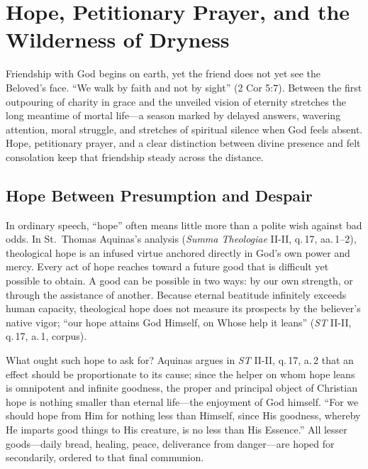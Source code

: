 \section{Hope, Petitionary Prayer, and the Wilderness of Dryness}

Friendship with God begins on earth, yet the friend does not yet see the Beloved's face. ``We walk by faith and not by sight'' (2 Cor 5:7). Between the first outpouring of charity in grace and the unveiled vision of eternity stretches the long meantime of mortal life---a season marked by delayed answers, wavering attention, moral struggle, and stretches of spiritual silence when God feels absent. Hope, petitionary prayer, and a clear distinction between divine presence and felt consolation keep that friendship steady across the distance.

\subsection*{Hope Between Presumption and Despair}

In ordinary speech, ``hope'' often means little more than a polite wish against bad odds. In St.\ Thomas Aquinas's analysis (\emph{Summa Theologiae} II-II, q.\,17, aa.\,1--2), theological hope is an infused virtue anchored directly in God's own power and mercy. Every act of hope reaches toward a future good that is difficult yet possible to obtain. A good can be possible in two ways: by our own strength, or through the assistance of another. Because eternal beatitude infinitely exceeds human capacity, theological hope does not measure its prospects by the believer's native vigor; ``our hope attains God Himself, on Whose help it leans'' (\emph{ST} II-II, q.\,17, a.\,1, corpus).

What ought such hope to ask for? Aquinas argues in \emph{ST} II-II, q.\,17, a.\,2 that an effect should be proportionate to its cause; since the helper on whom hope leans is omnipotent and infinite goodness, the proper and principal object of Christian hope is nothing smaller than eternal life---the enjoyment of God himself. ``For we should hope from Him for nothing less than Himself, since His goodness, whereby He imparts good things to His creature, is no less than His Essence.'' All lesser goods---daily bread, healing, peace, deliverance from danger---are hoped for secondarily, ordered to that final communion.

